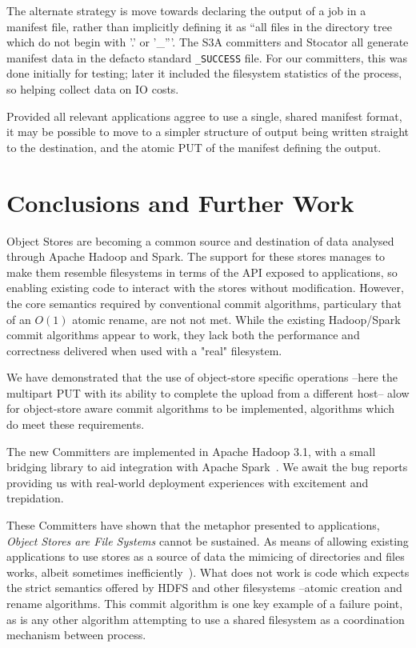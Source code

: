 \documentclass[conference]{IEEEtran}
\begin{document}
The alternate strategy is move towards declaring the output of a job in
a manifest file, rather than implicitly defining it as ``all files in the directory
tree which do not begin with '.' or '\_'''.
The S3A committers and Stocator all generate manifest data in the defacto
standard \texttt{\_SUCCESS} file.
For our committers, this was done initially for testing;
later it included the filesystem statistics of the process, so helping
collect data on IO costs.

Provided all relevant applications aggree to use a single, shared manifest
format, it may be possible to move to a simpler structure of
output being written straight to the destination, and the atomic PUT of the
manifest defining the output.


\section{Conclusions and Further Work}
\label{sec:conclusions}

Object Stores are becoming a common source and destination of data analysed
through Apache Hadoop and Spark.
The support for these stores manages to make them resemble filesystems in
terms of the API exposed to applications, so enabling existing code to
interact with the stores without modification.
However, the core semantics required by conventional commit algorithms, particulary
that of an $O(1)$ atomic rename, are not not met.
While the existing Hadoop/Spark commit algorithms appear to work, they lack
both the performance and correctness delivered when used with a "real" filesystem.

We have demonstrated that the use of object-store specific operations --here
the multipart PUT with its ability to complete the upload from a different host--
alow for object-store aware commit algorithms to be implemented,
algorithms which do meet these requirements.

The new Committers are implemented in Apache Hadoop 3.1, with a small bridging
library to aid integration with Apache Spark\ \cite{HADOOP-13786}.
We await the bug reports providing us with real-world deployment experiences
with excitement and trepidation.


These Committers have shown that the metaphor presented to applications,
\emph{Object Stores are File Systems} cannot be sustained.
As means of allowing existing applications to use stores as a source
of data the mimicing of directories and files works, albeit sometimes
inefficiently\ \cite{HADOOP-13208}).
What does not work is code which expects the strict semantics
offered by HDFS and other filesystems --atomic creation and rename algorithms.
This commit algorithm is one key example of a failure point, as
is any other algorithm attempting to use a shared filesystem
as a coordination mechanism between process.
\end{document}
